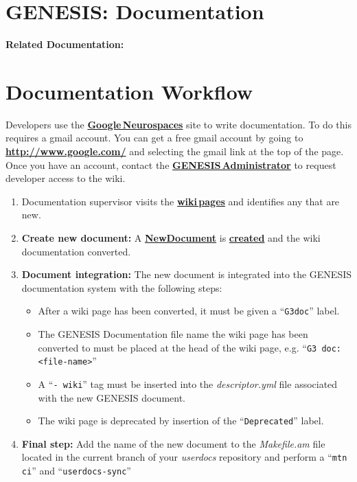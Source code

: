 \documentclass[12pt]{article}
\begin{document}
\section*{GENESIS: Documentation}

{\bf Related Documentation:}

\section*{Documentation Workflow}

Developers use the \href{http://code.google.com/p/neurospaces/wiki/Index}{\bf Google\,Neurospaces} site to write documentation. To do this requires a gmail account. You can get a free gmail account by going to \href{http://www.google.com/}{\bf http://www.google.com/} and selecting the gmail link at the top of the page. Once you have an account, contact the \href{http://www.genesis-sim.org/contact}{\bf GENESIS\,Administrator} to request developer access to the wiki.
\begin{enumerate}
\item Documentation supervisor visits the \href{http://code.google.com/p/neurospaces/w/list}{\bf wiki\,pages} and identifies any that are new.
\item{\bf Create new document:} A \href{../NewDocument/NewDocument.tex}{\bf NewDocument} is \href{../document-create/document-create.tex}{\bf created} and the wiki documentation converted.
\item{\bf Document integration:} The new document is integrated into the GENESIS documentation system with the following steps:
\begin{itemize}
\item  After a wiki page has been converted, it must be given a ``{\tt G3doc}'' label.
\item The GENESIS Documentation file name the wiki page has been converted to must be placed at the head of the wiki page, e.g. ``{\tt G3 doc: <file-name>}''
\item A ``{\tt -\,wiki}'' tag must be inserted into the {\it descriptor.yml} file associated with the new GENESIS document.
\item The wiki page is deprecated by insertion of the ``{\tt Deprecated}'' label.
\end{itemize}
\item {\bf Final step:} Add the name of the new document to the {\it Makefile.am} file located in the current branch of your {\it userdocs} repository and perform a ``{\tt mtn ci}'' and ``{\tt userdocs-sync}''
\end{enumerate}
\end{document}
